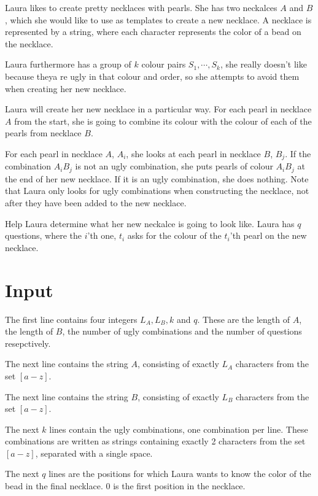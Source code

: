 \noindent
Laura likes to create pretty necklaces with pearls. 
She has two neckalces $A$ and $B$, which she would like to use as templates to create a new necklace.
A necklace is represented by a string, where each character represents the color of a bead on the necklace.

Laura furthermore has a group of $k$ colour pairs $S_1, \cdots, S_k$, 
she really doesn't like because theya re ugly in that colour and order, 
so she attempts to avoid them when creating her new necklace.

Laura will create her new necklace in a particular way. 
For each pearl in necklace $A$ from the start, 
she is going to combine its colour with the colour of each of 
the pearls from necklace $B$.

For each pearl in necklace $A$, $A_i$, 
she looks at each pearl in necklace $B$, $B_j$.
If the combination $A_iB_j$ is not an ugly combination, she puts pearls of colour $A_iB_j$ at the end of her new necklace.
If it is an ugly combination, she does nothing. 
Note that Laura only looks for ugly combinations when constructing the necklace, not after they have been added to the new necklace.

Help Laura determine what her new neckalce is going to look like. Laura has $q$ questions, where the $i$'th one, $t_i$ asks for the colour of the $t_i$'th pearl on the new necklace.

\section*{Input}
The first line contains four integers $L_A, L_B, k$ and $q$. 
These are the length of $A$, the length of $B$, the number of ugly combinations and the number of questions resepctively.

The next line contains the string $A$, consisting of exactly $L_A$ characters from the set $[a-z]$.

The next line contains the string $B$, consisting of exactly $L_B$ characters from the set $[a-z]$.

The next $k$ lines contain the ugly combinations, one combination per line. 
These combinations are written as strings containing exactly 2 characters from the set $[a-z]$, separated with a single space.

The next $q$ lines are the positions for which Laura wants to know the color of the bead in the final necklace. 
0 is the first position in the necklace.

